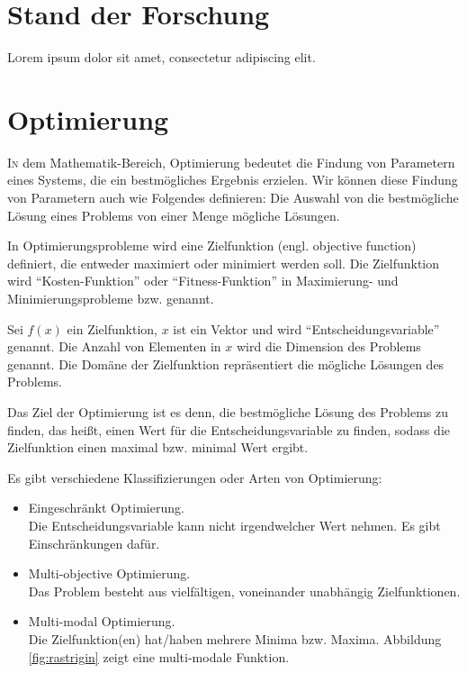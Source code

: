 \documentclass[twoside,twocolumn]{article}
\begin{document}
\section{Stand der Forschung}

\lettrine[nindent=0em,lines=3]{L} orem ipsum dolor sit amet, consectetur adipiscing elit.
\blindtext %


\section{Optimierung}

\lettrine[nindent=0em,lines=3]{I} n dem Mathematik-Bereich, Optimierung bedeutet die Findung von Parametern eines Systems, die ein bestmögliches Ergebnis erzielen. \cite{wiki_optimierung} Wir können diese Findung von Parametern auch wie Folgendes definieren: Die Auswahl von die bestmögliche Lösung eines Problems von einer Menge mögliche Lösungen.\par
In Optimierungsprobleme wird eine Zielfunktion (engl. objective function) definiert, die entweder maximiert oder minimiert werden soll. Die Zielfunktion wird ``Kosten-Funktion'' oder ``Fitness-Funktion'' in Maximierung- und Minimierungsprobleme bzw. genannt.\par
Sei $f(x)$ ein Zielfunktion, $x$ ist ein Vektor und wird ``Entscheidungsvariable'' genannt. Die Anzahl von Elementen in $x$ wird die Dimension des Problems genannt.
Die Domäne der Zielfunktion repräsentiert die mögliche Lösungen des Problems. \par
Das Ziel der Optimierung ist es denn, die bestmögliche Lösung des Problems zu finden, das heißt, einen Wert für die Entscheidungsvariable zu finden, sodass die Zielfunktion einen maximal bzw. minimal Wert ergibt.\par
Es gibt verschiedene Klassifizierungen oder Arten von Optimierung:

\begin{itemize}
\item{Eingeschränkt Optimierung.}\\
Die Entscheidungsvariable kann nicht irgendwelcher Wert nehmen. Es gibt Einschränkungen dafür.\\
\item{Multi-objective Optimierung.}\\
Das Problem besteht aus vielfältigen, voneinander unabhängig Zielfunktionen.\\
\item{Multi-modal Optimierung.}\\
Die Zielfunktion(en) hat/haben mehrere Minima bzw. Maxima. Abbildung \ref{fig:rastrigin} zeigt eine multi-modale Funktion.
\end{itemize}
\end{document}
